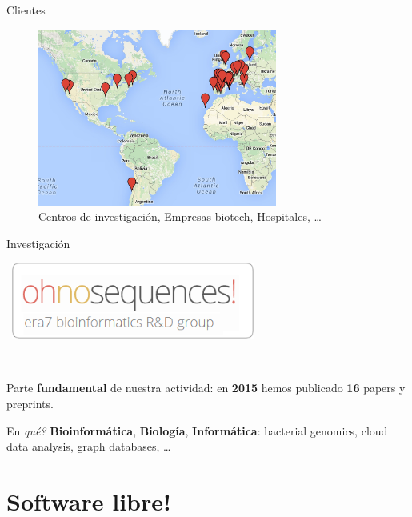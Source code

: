 \documentclass[12pt,compress]{beamer}
\let\OldHref\href
\renewcommand{\href}[2]{\OldHref[pdfnewwindow]{#1}{{\textbf{#2}}}}
\begin{document}
\begin{frame}{Clientes}

\begin{figure}[htbp]
\centering
\includegraphics[width=0.70000\textwidth]{images/clients.jpg}
\caption{Centros de investigación, Empresas biotech, Hospitales,
\ldots{}}
\end{figure}

\end{frame}

\begin{frame}{Investigación}

~\includegraphics[width=0.60000\textwidth]{images/ohnosequences.png}

~

Parte \textbf{fundamental} de nuestra actividad: en \textbf{2015} hemos
publicado \textbf{16} papers y preprints.

En \emph{qué?} \textbf{Bioinformática}, \textbf{Biología},
\textbf{Informática}: bacterial genomics, cloud data analysis, graph
databases, \ldots{}

\end{frame}

\section{Software libre!}\label{software-libre}

\end{document}
